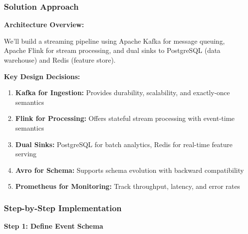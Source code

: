 \subsubsection{Solution Approach}

\textbf{Architecture Overview:}

We'll build a streaming pipeline using Apache Kafka for message queuing, Apache Flink for stream processing, and dual sinks to PostgreSQL (data warehouse) and Redis (feature store).

\textbf{Key Design Decisions:}
\begin{enumerate}
    \item \textbf{Kafka for Ingestion:} Provides durability, scalability, and exactly-once semantics
    \item \textbf{Flink for Processing:} Offers stateful stream processing with event-time semantics
    \item \textbf{Dual Sinks:} PostgreSQL for batch analytics, Redis for real-time feature serving
    \item \textbf{Avro for Schema:} Supports schema evolution with backward compatibility
    \item \textbf{Prometheus for Monitoring:} Track throughput, latency, and error rates
\end{enumerate}

\subsubsection{Step-by-Step Implementation}

\textbf{Step 1: Define Event Schema}


